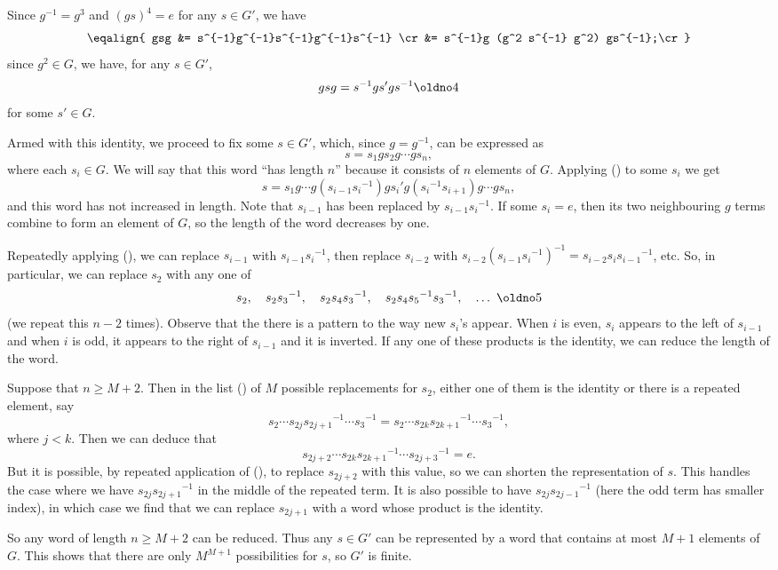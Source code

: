 \proof Since $g^{-1} = g^3$ and $(gs)^4 = e$ for any $s\in G'$, we have
$$\eqalign{
gsg &= s^{-1}g^{-1}s^{-1}g^{-1}s^{-1} \cr
&= s^{-1}g (g^2 s^{-1} g^2) gs^{-1};\cr
}$$
since $g^2\in G$, we have, for any $s\in G'$,
$$gsg = s^{-1}gs'gs^{-1} \oldno 4$$
for some $s'\in G$.

Armed with this identity, we proceed to fix some $s\in G'$, which, since $g = g^{-1}$, can be expressed as
$$s = s_1gs_2g\cdots gs_n,$$
where each $s_i\in G$. We will say that this word ``has length $n$'' because it consists of $n$ elements of $G$. Applying ({}) to some $s_i$ we get
$$s = s_1g \cdots g (s_{i-1}{s_i}^{-1})g {s_i}' g ({s_i}^{-1}s_{i+1}) g \cdots gs_n,$$
and this word has not increased in length. Note that $s_{i-1}$ has been replaced by $s_{i-1}{s_i}^{-1}$. If some $s_i = e$, then its two neighbouring $g$ terms combine to form an element of $G$, so the length of the word decreases by one.

Repeatedly applying ({}), we can replace $s_{i-1}$ with $s_{i-1}{s_i}^{-1}$, then replace $s_{i-2}$ with $s_{i-2}(s_{i-1}{s_i}^{-1})^{-1} = s_{i-2}s_i{s_{i-1}}^{-1}$, etc. So, in particular, we can replace $s_2$ with any one of
$$s_2, \quad s_2{s_3}^{-1}, \quad s_2s_4{s_3}^{-1},\quad s_2s_4{s_5}^{-1}{s_3}^{-1},\quad  \ldots\ \oldno 5$$
(we repeat this $n-2$ times). Observe that the there is a pattern to the way new $s_i$'s appear. When $i$ is even, $s_i$ appears to the left of $s_{i-1}$ and when $i$ is odd, it appears to the right of $s_{i-1}$ and it is inverted. If any one of these products is the identity, we can reduce the length of the word.

Suppose that $n\geq M+2$. Then in the list ({}) of $M$ possible replacements for $s_2$, either one of them is the identity or there is a repeated element, say
$$s_2\cdots s_{2j}{s_{2j+1}}^{-1}\cdots {s_3}^{-1} = s_2 \cdots s_{2k}{s_{2k+1}}^{-1} \cdots {s_3}^{-1},$$
where $j<k$. Then we can deduce that
$$s_{2j+2}\cdots  s_{2k}{s_{2k+1}}^{-1} \cdots {s_{2j+3}}^{-1} = e.$$
But it is possible, by repeated application of ({}), to replace $s_{2j+2}$ with this value, so we can shorten the representation of $s$. This handles the case where we have $s_{2j}{s_{2j+1}}^{-1}$ in the middle of the repeated term. It is also possible to have $s_{2j}{s_{2j-1}}^{-1}$ (here the odd term has smaller index), in which case we find that we can replace $s_{2j+1}$ with a word whose product is the identity.

So any word of length $n\geq M+2$ can be reduced. Thus any $s\in G'$ can be represented by a word that contains at most $M+1$ elements of $G$. This shows that there are only $M^{M+1}$ possibilities for $s$, so $G'$ is finite.\slug


